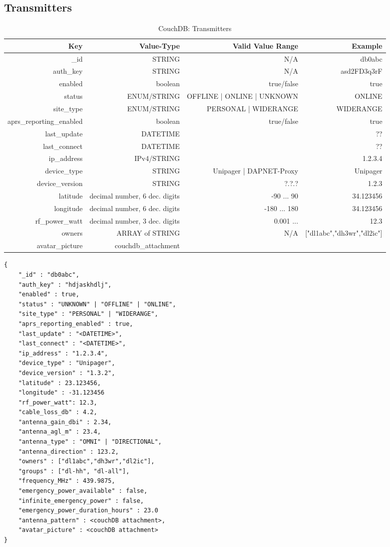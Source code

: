 \subsection{Transmitters}
\begin{table}[h]
 \caption{CouchDB: Transmitters}
 \begin{tabular}{r|r|r|r}
  Key & Value-Type & Valid Value Range & Example \\
  \hline
  \_id & STRING & N/A & db0abc \\
  auth\_key & STRING & N/A & asd2FD3q3rF \\
  enabled & boolean & true/false & true \\
  status & ENUM/STRING & OFFLINE | ONLINE | UNKNOWN & ONLINE \\
  site\_type & ENUM/STRING & PERSONAL | WIDERANGE & WIDERANGE \\
  aprs\_reporting\_enabled & boolean & true/false & true \\
  last\_update & DATETIME & & ??\\
  last\_connect & DATETIME & & ??\\
  ip\_address & IPv4/STRING & & 1.2.3.4 \\
  device\_type & STRING & Unipager | DAPNET-Proxy & Unipager \\
  device\_version & STRING & ?.?.? & 1.2.3 \\
  latitude & decimal number, 6 dec. digits & -90 ... 90 & 34.123456 \\
  longitude & decimal number, 6 dec. digits & -180 ... 180 & 34.123456 \\
  rf\_power\_watt & decimal number, 3 dec. digits & 0.001 ...  & 12.3 \\ 
    
  
  owners & ARRAY of STRING & N/A & ["dl1abc","dh3wr","dl2ic"] \\
  avatar\_picture & couchdb\_attachment & & \\
  \end{tabular}
  \label{tab:couchdb:transmitters}
\end{table}

\begin{lstlisting}
{
	"_id" : "db0abc",
    "auth_key" : "hdjaskhdlj",
    "enabled" : true,
	"status" : "UNKNOWN" | "OFFLINE" | "ONLINE",
	"site_type" : "PERSONAL" | "WIDERANGE",
	"aprs_reporting_enabled" : true,
    "last_update" : "<DATETIME>",
	"last_connect" : "<DATETIME>",
    "ip_address" : "1.2.3.4",
    "device_type" : "Unipager",
    "device_version" : "1.3.2",
    "latitude" : 23.123456,
    "longitude" : -31.123456
    "rf_power_watt": 12.3,
    "cable_loss_db" : 4.2,
    "antenna_gain_dbi" : 2.34,
	"antenna_agl_m" : 23.4,
	"antenna_type" : "OMNI" | "DIRECTIONAL",
	"antenna_direction" : 123.2,
    "owners" : ["dl1abc","dh3wr","dl2ic"],
    "groups" : ["dl-hh", "dl-all"],
    "frequency_MHz" : 439.9875,
    "emergency_power_available" : false,
    "infinite_emergency_power" : false,
	"emergency_power_duration_hours" : 23.0        
    "antenna_pattern" : <couchDB attachment>,
    "avatar_picture" : <couchDB attachment>
}
\end{lstlisting}

